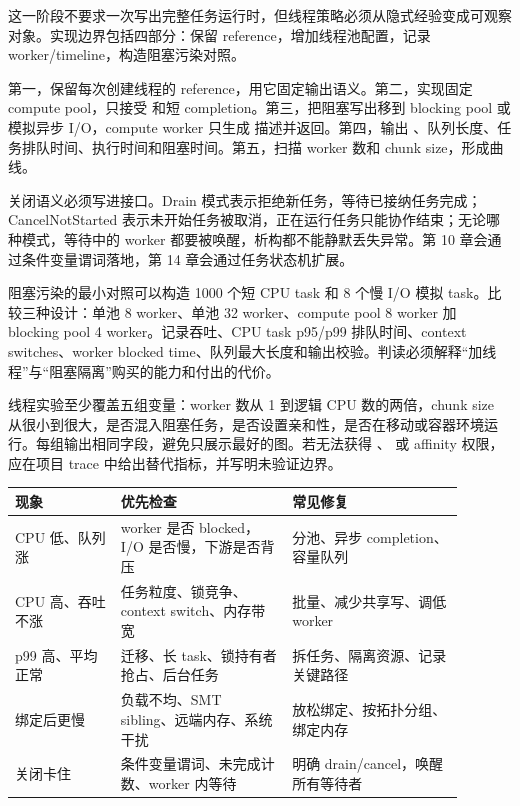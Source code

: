 这一阶段不要求一次写出完整任务运行时，但线程策略必须从隐式经验变成可观察对象。实现边界包括四部分：保留 reference，增加线程池配置，记录 worker/timeline，构造阻塞污染对照。

第一，保留每次创建线程的 reference，用它固定输出语义。第二，实现固定 compute pool，只接受  和短 completion。第三，把阻塞写出移到 blocking pool 或模拟异步 I/O，compute worker 只生成  描述并返回。第四，输出 、队列长度、任务排队时间、执行时间和阻塞时间。第五，扫描 worker 数和 chunk size，形成曲线。

关闭语义必须写进接口。Drain 模式表示拒绝新任务，等待已接纳任务完成；CancelNotStarted 表示未开始任务被取消，正在运行任务只能协作结束；无论哪种模式，等待中的 worker 都要被唤醒，析构都不能静默丢失异常。第 10 章会通过条件变量谓词落地，第 14 章会通过任务状态机扩展。

阻塞污染的最小对照可以构造 1000 个短 CPU task 和 8 个慢 I/O 模拟 task。比较三种设计：单池 8 worker、单池 32 worker、compute pool 8 worker 加 blocking pool 4 worker。记录吞吐、CPU task p95/p99 排队时间、context switches、worker blocked time、队列最大长度和输出校验。判读必须解释“加线程”与“阻塞隔离”购买的能力和付出的代价。

线程实验至少覆盖五组变量：worker 数从 1 到逻辑 CPU 数的两倍，chunk size 从很小到很大，是否混入阻塞任务，是否设置亲和性，是否在移动或容器环境运行。每组输出相同字段，避免只展示最好的图。若无法获得 、 或 affinity 权限，应在项目 trace 中给出替代指标，并写明未验证边界。

\begin{center}
\begin{tabular}{@{}p{0.21\linewidth}p{0.34\linewidth}p{0.34\linewidth}@{}}
\toprule
现象 & 优先检查 & 常见修复 \\
\midrule
CPU 低、队列涨 & worker 是否 blocked，I/O 是否慢，下游是否背压 & 分池、异步 completion、容量队列 \\
CPU 高、吞吐不涨 & 任务粒度、锁竞争、context switch、内存带宽 & 批量、减少共享写、调低 worker \\
p99 高、平均正常 & 迁移、长 task、锁持有者抢占、后台任务 & 拆任务、隔离资源、记录关键路径 \\
绑定后更慢 & 负载不均、SMT sibling、远端内存、系统干扰 & 放松绑定、按拓扑分组、绑定内存 \\
关闭卡住 & 条件变量谓词、未完成计数、worker 内等待 & 明确 drain/cancel，唤醒所有等待者 \\
\bottomrule
\end{tabular}
\end{center}

